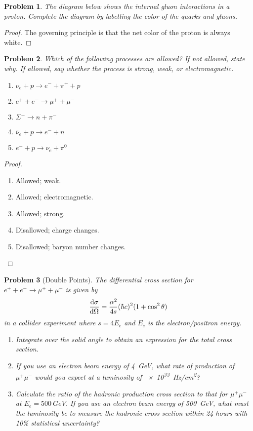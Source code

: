 \documentclass{article}
\newtheorem{plm}{Problem}
\begin{document}
\begin{plm}
  The diagram below shows the internal gluon interactions in a proton.
  Complete the diagram by labelling the color of the quarks and gluons.
\end{plm}

\begin{proof}
  The governing principle is that the net color of the proton is always white.

\end{proof}

\begin{plm}
  Which of the following processes are allowed?
  If not allowed, state why.
  If allowed, say whether the process is strong, weak, or electromagnetic.
  \begin{enumerate}
  \item $\nu_{e} + p \to e^{-} + \pi^{+} + p$
  \item $e^{+} + e^{-} \to \mu^{+} + \mu^{-}$
  \item $\Sigma^{-} \to n + \pi^{-}$
  \item $\bar{\nu}_{e} + p \to e^{-} + n$
  \item $e^{-} + p \to \nu_{e} + \pi^{0}$
  \end{enumerate}
\end{plm}

\begin{proof} \;
  \begin{enumerate}
  \item Allowed; weak.
  \item Allowed; electromagnetic.
  \item Allowed; strong.
  \item Disallowed; charge changes.
  \item Disallowed; baryon number changes.
  \end{enumerate}
\end{proof}

\begin{plm}[Double Points]
  The differential cross section for $e^{+} + e^{-} \to \mu^{+} + \mu^{-}$ is given by
  \[
    \dv{\sigma}{\Omega} = \frac{\alpha^{2}}{4s}(\hbar c)^{2}(1 + \cos^{2}\theta)
  \]
  in a collider experiment where $s = 4E_{e}$ and $E_{e}$ is the electron/positron energy.
  \begin{enumerate}
  \item Integrate over the solid angle to obtain an expression for the total cross section.
  \item If you use an electron beam energy of \SI{4}{GeV}, what rate of production of $\mu^{+}\mu^{-}$ would you expect at a luminosity of
    \SI{e33}{Hz/cm^{2}}?
  \item Calculate the ratio of the hadronic production cross section to that for $\mu^{+}\mu^{-}$ at $E_{e} = \SI{500}{GeV}$.
    If you use an electron beam energy of \SI{500}{GeV}, what must the luminosity be to measure the hadronic cross section within 24 hours
    with 10\% statistical uncertainty?
  \end{enumerate}
\end{plm}
\end{document}
